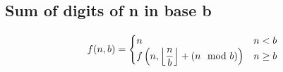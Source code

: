 \subsection{Sum of digits of n in base b}
$$
f(n, b) = \begin{cases}
    n & n < b\\
    f \left( n, \floor*{\dfrac{n}{b}} + (n \mod b) \right) & n \geq b \\
\end{cases}
$$
